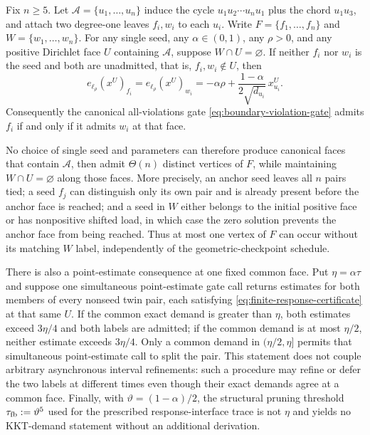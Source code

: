 \begin{proposition}
\label{prop:notched-sun-rppr-trace-obstruction}
Fix $n\geq5$.  Let
$\mathcal A=\{u_1,\ldots,u_n\}$ induce the cycle
$u_1u_2\cdots u_nu_1$ plus the chord $u_1u_3$, and attach two degree-one
leaves $f_i,w_i$ to each $u_i$.  Write
$F=\{f_1,\ldots,f_n\}$ and $W=\{w_1,\ldots,w_n\}$.
For any single seed, any $\alpha\in(0,1)$, any $\rho>0$, and any positive
Dirichlet face $U$ containing $\mathcal A$, suppose $W\cap U=\varnothing$.
If neither $f_i$ nor $w_i$ is the seed and both are unadmitted, that is,
$f_i,w_i\notin U$, then
\begin{equation}
 e_{\ell_\rho}(x^U)_{f_i}
 =e_{\ell_\rho}(x^U)_{w_i}
 =-\alpha\rho
  +\frac{1-\alpha}{2\sqrt{d_{u_i}}}\,x^U_{u_i}.
 \label{eq:notched-sun-twin-demand}
\end{equation}
Consequently the canonical all-violations gate
\cref{eq:boundary-violation-gate} admits $f_i$ if and only if it admits
$w_i$ at that face.

No choice of single seed and parameters can therefore produce canonical
faces that contain $\mathcal A$, then admit $\Theta(n)$ distinct vertices of
$F$, while maintaining $W\cap U=\varnothing$ along those faces.  More
precisely, an anchor
seed leaves all $n$ pairs tied; a seed $f_j$ can distinguish only its own pair
and is already present before the anchor face is reached; and a seed in $W$
either belongs to the initial positive face or has nonpositive shifted load,
in which case the zero solution prevents the anchor face from being reached.
Thus at most one vertex of $F$ can occur without its matching $W$ label,
independently of the
geometric-checkpoint schedule.

There is also a point-estimate consequence at one fixed common face.  Put
$\eta=\alpha\tau$ and suppose one simultaneous point-estimate gate call
returns estimates for both members of every nonseed twin pair, each satisfying
\cref{eq:finite-response-certificate} at that same $U$.  If the common exact
demand is greater than $\eta$, both estimates exceed $3\eta/4$ and both labels
are admitted; if the common demand is at most $\eta/2$, neither estimate
exceeds $3\eta/4$.  Only a common demand in $(\eta/2,\eta]$ permits that
simultaneous point-estimate call to split the pair.  This statement does not
couple arbitrary asynchronous interval refinements: such a procedure may
refine or defer the two labels at different times even though their exact
demands agree at a common face.  Finally, with
$\vartheta=(1-\alpha)/2$, the structural pruning threshold
$\tau_{\rm fb}:=\vartheta^5$ used for the prescribed response-interface trace
is not $\eta$ and yields no KKT-demand statement without an additional
derivation.
\end{proposition}

